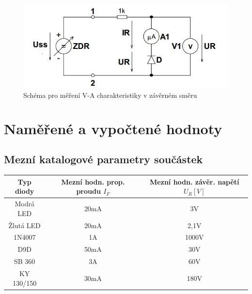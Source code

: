 \documentclass[12pt]{article} %
\begin{document}
\begin{figure}[H]
\includegraphics[scale=1]{zaverny.jpg}
\caption{Schéma pro měření V-A charakteristiky v závěrném směru}
\end{figure}
\newpage

\section{Naměřené a vypočtené hodnoty}
\subsection{Mezní katalogové parametry součástek}
\begin{tabular}{|c|c|c|}
\hline 
Typ diody & Mezní hodn. prop. proudu $I_F$ & Mezní hodn. závěr. napětí $U_R [V]$ \\ 
\hline 
Modrá LED & 20mA & 3V \\ 
\hline 
Žlutá LED & 20mA & 2,1V \\ 
\hline 
1N4007 & 1A & 1000V \\ 
\hline 
D9D & 50mA & 30V \\ 
\hline 
SB 360 & 3A & 60V \\ 
\hline 
KY 130/150 & 30mA & 180V \\ 
\hline 
\end{tabular}
\end{document}
